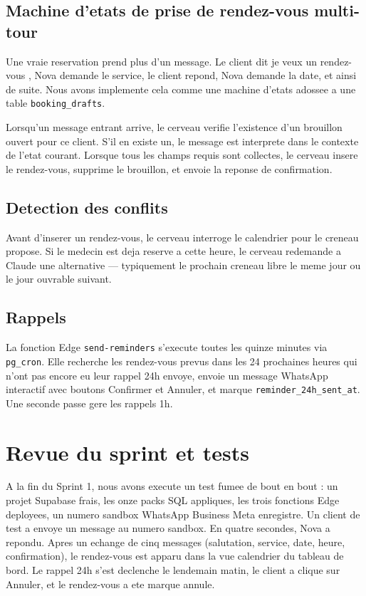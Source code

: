 \subsection{Machine d'etats de prise de rendez-vous multi-tour}
Une vraie reservation prend plus d'un message. Le client dit \og je
veux un rendez-vous \fg{}, Nova demande le service, le client repond,
Nova demande la date, et ainsi de suite. Nous avons implemente cela
comme une machine d'etats adossee a une table \texttt{booking\_drafts}.

Lorsqu'un message entrant arrive, le cerveau verifie l'existence d'un
brouillon ouvert pour ce client. S'il en existe un, le message est
interprete dans le contexte de l'etat courant. Lorsque tous les champs
requis sont collectes, le cerveau insere le rendez-vous, supprime le
brouillon, et envoie la reponse de confirmation.

\subsection{Detection des conflits}
Avant d'inserer un rendez-vous, le cerveau interroge le calendrier
pour le creneau propose. Si le medecin est deja reserve a cette heure,
le cerveau redemande a Claude une alternative --- typiquement le
prochain creneau libre le meme jour ou le jour ouvrable suivant.

\subsection{Rappels}
La fonction Edge \texttt{send-reminders} s'execute toutes les quinze
minutes via \texttt{pg\_cron}. Elle recherche les rendez-vous prevus
dans les 24 prochaines heures qui n'ont pas encore eu leur rappel 24h
envoye, envoie un message WhatsApp interactif avec boutons Confirmer
et Annuler, et marque \texttt{reminder\_24h\_sent\_at}. Une seconde
passe gere les rappels 1h.

\section{Revue du sprint et tests}
A la fin du Sprint 1, nous avons execute un test fumee de bout en
bout : un projet Supabase frais, les onze packs SQL appliques, les
trois fonctions Edge deployees, un numero sandbox WhatsApp Business
Meta enregistre. Un client de test a envoye un message au numero
sandbox. En quatre secondes, Nova a repondu. Apres un echange de cinq
messages (salutation, service, date, heure, confirmation), le
rendez-vous est apparu dans la vue calendrier du tableau de bord. Le
rappel 24h s'est declenche le lendemain matin, le client a clique sur
Annuler, et le rendez-vous a ete marque annule.

